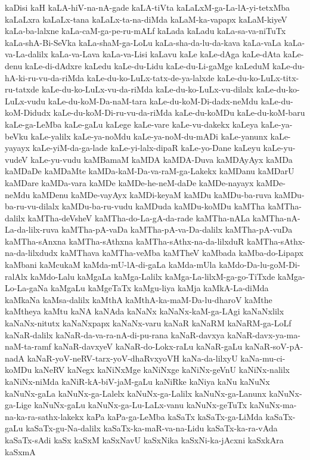 {kaDisi
kaH
kaLA-hiV-na-nA-gade
kaLA-tiVta
kaLaLxM-ga-La-lA-yi-tetxMba
kaLaLxra
kaLaLx-tana
kaLaLx-ta-na-diMda
kaLaM-ka-vapapx
kaLaM-kiyeV
kaLa-ba-lalxne
kaLa-caM-ga-pe-ru-mALf
kaLada
kaLadu
kaLa-sa-va-niTuTx
kaLa-shA-Bi-SeVka
kaLa-shaM-ga-LoLu
kaLa-sha-da-lu-da-kava
kaLa-vaLa
kaLa-va-La-dalilx
kaLa-va-Lava
kaLa-va-Lisi
kaLavu
kaLe
kaLe-dAga
kaLe-dAta
kaLe-denu
kaLe-di-dAdxre
kaLedu
kaLe-du-Lidu
kaLe-du-Li-gaMge
kaLeduM
kaLe-du-hA-ki-ru-vu-da-riMda
kaLe-du-ko-LuLx-tatx-de-ya-lalxde
kaLe-du-ko-LuLx-titx-ru-tatxde
kaLe-du-ko-LuLx-vu-da-riMda
kaLe-du-ko-LuLx-vu-dilalx
kaLe-du-ko-LuLx-vudu
kaLe-du-koM-Da-naM-tara
kaLe-du-koM-Di-dadx-neMdu
kaLe-du-koM-Didudx
kaLe-du-koM-Di-ru-vu-da-riMda
kaLe-du-koMDu
kaLe-du-koM-baru
kaLe-ga-LeMba
kaLe-gaLu
kaLege
kaLe-vare
kaLe-vu-dakekx
kaLeya
kaLe-ya-beVku
kaLe-yalilx
kaLe-ya-noMdu
kaLe-ya-noM-du-mADi
kaLe-yanunx
kaLe-yayayx
kaLe-yiM-da-ga-lade
kaLe-yi-lalx-dipaR
kaLe-yo-Dane
kaLeyu
kaLe-yu-vudeV
kaLe-yu-vudu
kaMBamaM
kaMDA
kaMDA-Duva
kaMDAyAyx
kaMDa
kaMDaDe
kaMDaMte
kaMDa-kaM-Da-va-raM-ga-Lakekx
kaMDanu
kaMDarU
kaMDare
kaMDa-vara
kaMDe
kaMDe-he-neM-daDe
kaMDe-nayayx
kaMDe-neMdu
kaMDenu
kaMDe-vayAyx
kaMDi-keyaM
kaMDu
kaMDu-ba-ruva
kaMDu-ba-ru-vu-dilalx
kaMDu-ba-ru-vudu
kaMDuda
kaMDu-koMDu
kaMTha
kaMTha-dalilx
kaMTha-deVsheV
kaMTha-do-La-gA-da-rade
kaMTha-nALa
kaMTha-nA-La-da-lilx-ruva
kaMTha-pA-vaDa
kaMTha-pA-va-Da-dalilx
kaMTha-pA-vuDa
kaMTha-sAnxna
kaMTha-sAthxna
kaMTha-sAthx-na-da-lilxduR
kaMTha-sAthx-na-da-lilxdudx
kaMThava
kaMTha-veMba
kaMTheV
kaMbada
kaMba-do-Lipapx
kaMbani
kaMcukaM
kaMda-mU-lA-di-gaLa
kaMda-mUla
kaMdo-Da-lu-goM-Di-ralAlx
kaMdo-Lalu
kaMgaLa
kaMga-Lalilx
kaMga-La-lilxM-ga-go-TiTxde
kaMga-Lo-La-gaNa
kaMgaLu
kaMgeTaTx
kaMgu-liya
kaMja
kaMkA-La-diMda
kaMkaNa
kaMsa-dalilx
kaMthA
kaMthA-ka-maM-Da-lu-dharoV
kaMthe
kaMtheya
kaMtu
kaNA
kaNAda
kaNaNx
kaNaNx-kaM-ga-LAgi
kaNaNxlilx
kaNaNx-nitutx
kaNaNxpapx
kaNaNx-varu
kaNaR
kaNaRM
kaNaRM-ga-LoLf
kaNaR-dalilx
kaNaR-da-va-ra-nA-di-pu-rana
kaNaR-davxya
kaNaR-davx-ya-ma-naM-ta-ramf
kaNaR-davxyeV
kaNaR-do-Lokx-raLu
kaNaR-gaLu
kaNaR-soV-pA-nadA
kaNaR-yoV-neRV-tarx-yoV-dhaRvxyoVH
kaNa-da-lilxyU
kaNa-mu-ci-koMDu
kaNeRV
kaNegx
kaNiNxMge
kaNiNxge
kaNiNx-geVnU
kaNiNx-nalilx
kaNiNx-niMda
kaNiR-kA-biV-jaM-gaLu
kaNiRke
kaNiya
kaNu
kaNuNx
kaNuNx-gaLa
kaNuNx-ga-Lalelx
kaNuNx-ga-Lalilx
kaNuNx-ga-Lanunx
kaNuNx-ga-Lige
kaNuNx-gaLu
kaNuNx-ga-Lu-LaLx-vanu
kaNuNx-geTuTx
kaNuNx-ma-na-ka-ra-sathx-lakekx
kaPa
kaPa-ga-LeMba
kaSaTx
kaSaTx-ga-LiMda
kaSaTx-gaLu
kaSaTx-gu-Na-dalilx
kaSaTx-ka-maR-va-na-Lidu
kaSaTx-ka-ra-vAda
kaSaTx-sAdi
kaSx
kaSxM
kaSxNavU
kaSxNika
kaSxNi-ka-jAcxni
kaSxkAra
kaSxmA
}
